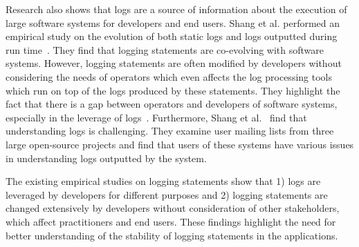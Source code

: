 



Research also shows that logs are a source of information about the execution of large software systems for developers and end users. Shang et al. performed an empirical study on the evolution of both static logs and logs outputted during run time~\cite{EMSEIAN,PaperIanCIIII}. They find that logging statements are co-evolving with software systems. However, logging statements are often modified by developers without considering the needs of operators which even affects the log processing tools which run on top of the logs produced by these statements. They highlight the fact that there is a gap between operators and developers of software systems, especially in the leverage of logs~\cite{IanGap}. Furthermore, Shang et al.~\cite{IanIcesm} find that understanding logs is challenging. They examine user mailing lists from three large open-source projects and find that users of these systems have various issues in understanding logs outputted by the system. 


The existing empirical studies on logging statements show that 1) logs are leveraged by developers for different purposes and 2) logging statements are changed extensively by developers without consideration of other stakeholders,  which affect practitioners and end users. These findings highlight the need for better understanding of the stability of logging statements in the applications. 




  



